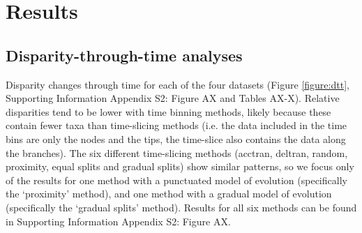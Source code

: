 \documentclass[12pt,a4paper]{article}
\begin{document}
\section{Results} 

\subsection{Disparity-through-time analyses}

Disparity changes through time for each of the four datasets (Figure \ref{figure:dtt}, Supporting Information Appendix S2: Figure AX and Tables AX-X). %
Relative disparities tend to be lower with time binning methods, likely because these contain fewer taxa than time-slicing methods (i.e. the data included in the time bins are only the nodes and the tips, the time-slice also contains the data along the branches).
The six different time-slicing methods (acctran, deltran, random, proximity, equal splits and gradual splits) show similar patterns, so we focus only of the results for one method with a punctuated model of evolution (specifically the `proximity' method), and one method with a gradual model of evolution (specifically the `gradual splits' method).
Results for all six methods can be found in Supporting Information Appendix S2: Figure AX. %
\end{document}

